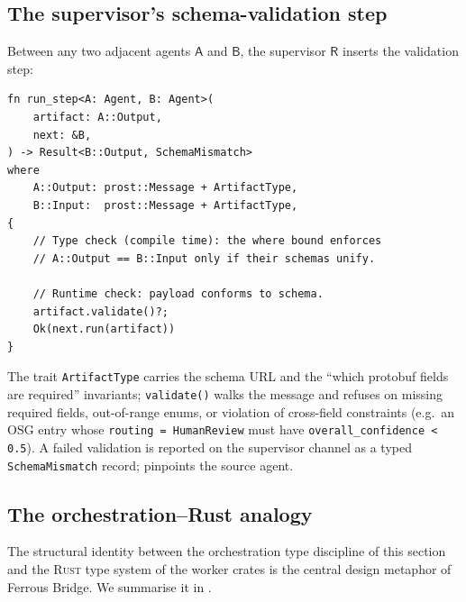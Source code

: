 \documentclass[12pt]{article}
\theoremstyle{definition}
\theoremstyle{remark}
\newcommand{\rust}{\textnormal{\textsc{Rust}}}
\newcommand{\Agent}[1]{\ensuremath{\mathsf{#1}}}
\begin{document}
\subsection{The supervisor's schema-validation step}

Between any two adjacent agents \(\Agent{A}\) and \(\Agent{B}\), the
supervisor \(\Agent{R}\) inserts the validation step:

\begin{lstlisting}[style=ruststyle]
fn run_step<A: Agent, B: Agent>(
    artifact: A::Output,
    next: &B,
) -> Result<B::Output, SchemaMismatch>
where
    A::Output: prost::Message + ArtifactType,
    B::Input:  prost::Message + ArtifactType,
{
    // Type check (compile time): the where bound enforces
    // A::Output == B::Input only if their schemas unify.

    // Runtime check: payload conforms to schema.
    artifact.validate()?;
    Ok(next.run(artifact))
}
\end{lstlisting}

The trait \texttt{ArtifactType} carries the schema URL and the
``which protobuf fields are required'' invariants; \texttt{validate()}
walks the message and refuses on missing required fields, out-of-range
enums, or violation of cross-field constraints (e.g.\ an OSG entry
whose \texttt{routing = HumanReview} must have
\texttt{overall\_confidence < 0.5}). A failed validation is reported on
the supervisor channel as a typed \texttt{SchemaMismatch} record;
 pinpoints the source agent.

\subsection{The orchestration--Rust analogy}

The structural identity between the orchestration type discipline of
this section and the \rust{} type system of the worker crates is the
central design metaphor of Ferrous Bridge. We summarise it in
.
\end{document}
